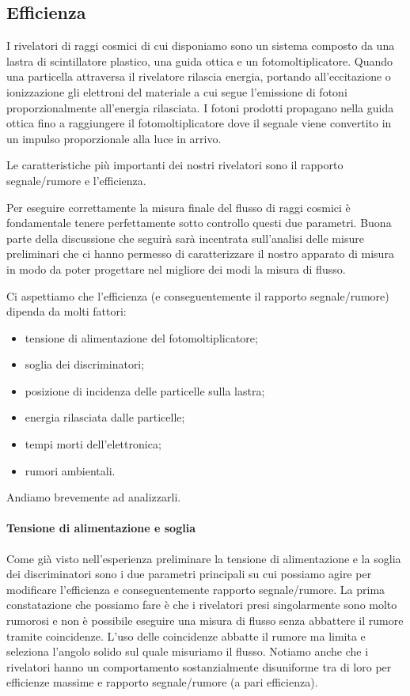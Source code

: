 \subsection{Efficienza}

I rivelatori di raggi cosmici di cui disponiamo sono un sistema composto da una lastra di scintillatore plastico, una guida ottica e un fotomoltiplicatore.
Quando una particella attraversa il rivelatore rilascia energia, portando all'eccitazione o ionizzazione gli elettroni del materiale a cui segue l'emissione di fotoni proporzionalmente all'energia rilasciata.
I fotoni prodotti propagano nella guida ottica fino a raggiungere il fotomoltiplicatore dove il segnale viene convertito in un impulso proporzionale alla luce in arrivo.

Le caratteristiche più importanti dei nostri rivelatori sono il rapporto segnale/rumore e l'efficienza.

Per eseguire correttamente la misura finale del flusso di raggi cosmici è fondamentale tenere perfettamente sotto controllo questi due parametri. Buona parte della discussione che seguirà sarà incentrata sull'analisi delle misure preliminari che ci hanno permesso di caratterizzare il nostro apparato di misura in modo da poter progettare nel migliore dei modi la misura di flusso.

Ci aspettiamo che l'efficienza (e conseguentemente il rapporto segnale/rumore) dipenda da molti fattori:
\begin{itemize}
	\item tensione di alimentazione del fotomoltiplicatore;
	\item soglia dei discriminatori;
	\item posizione di incidenza delle particelle sulla lastra;
	\item energia rilasciata dalle particelle;
	\item tempi morti dell'elettronica;
	\item rumori ambientali.
\end{itemize}
Andiamo brevemente ad analizzarli.

\paragraph{Tensione di alimentazione e soglia}
Come già visto nell'esperienza preliminare la tensione di alimentazione e la soglia dei discriminatori sono i due parametri principali su cui possiamo agire per modificare l'efficienza e conseguentemente rapporto segnale/rumore. La prima constatazione che possiamo fare è che i rivelatori presi singolarmente sono molto rumorosi e non è possibile eseguire una misura di flusso senza abbattere il rumore tramite coincidenze. L'uso delle coincidenze abbatte il rumore ma limita e seleziona l'angolo solido sul quale misuriamo il flusso. Notiamo anche che i rivelatori  hanno un comportamento sostanzialmente disuniforme tra di loro per efficienze massime e rapporto segnale/rumore (a pari efficienza).

